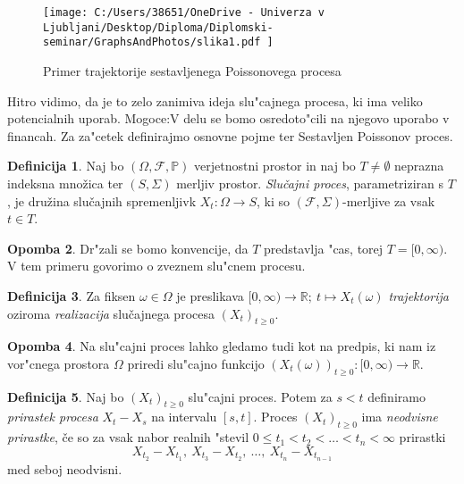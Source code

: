\documentclass[12pt,a4paper]{amsart}
\theoremstyle{definition} %
\newtheorem{definicija}{Definicija}[section]
\newtheorem{opomba}[definicija]{Opomba}
\theoremstyle{plain} %
\newcommand{\1}{\mathds{1}}
\begin{document}
    \begin{figure}[H]
        \centering
        \texttt{[image: 
            C:/Users/38651/OneDrive - Univerza v Ljubljani/Desktop/Diploma/Diplomski-seminar/GraphsAndPhotos/slika1.pdf
            ]}
        \caption{Primer trajektorije sestavljenega Poissonovega procesa}
        \label{fig:slika1}
    \end{figure}
    
    \noindent
    Hitro vidimo, da je to zelo zanimiva ideja slu"cajnega
    procesa, ki ima veliko potencialnih uporab. Mogoce:V delu se bomo osredoto"cili na njegovo uporabo v 
    financah. Za za"cetek definirajmo osnovne pojme ter Sestavljen Poissonov proces.

    \begin{definicija}
        Naj bo $(\Omega, \mathcal{F}, \mathbb{P})$ verjetnostni prostor in naj bo $T\neq\emptyset$
        neprazna indeksna množica ter $(S, \Sigma)$ merljiv prostor. \textit{Slučajni proces}, 
        parametriziran s $T$, je družina slučajnih spremenljivk $X_t : \Omega \to S$,
         ki so $(\mathcal{F}, \Sigma)$-merljive za vsak $t \in T$.
        \label{def:slucProc}
    \end{definicija}

    \begin{opomba}
        Dr"zali se bomo konvencije, da $T$ predstavlja "cas, torej $T = [0, \infty)$.
        V tem primeru govorimo o zveznem slu"cnem procesu.
        \label{op:TCas}
    \end{opomba}

    \begin{definicija}
        Za fiksen $\omega \in \Omega$ je preslikava 
        $[0, \infty) \rightarrow \mathbb{R}; \ t \mapsto X_t(\omega)$ 
        \textit{trajektorija} oziroma \textit{realizacija} slučajnega procesa $(X_t)_{t\geq0}$.
        \label{def:realizac}
    \end{definicija}

    \begin{opomba}
        Na slu"cajni proces lahko gledamo tudi kot na predpis, ki nam iz vor"cnega prostora 
        $\Omega$ priredi slu"cajno funkcijo
        $(X_t(\omega))_{t\geq0}: [0, \infty) \rightarrow \mathbb{R}$.
        \label{op:slucFunkc}
    \end{opomba}

    \begin{definicija}
        Naj bo $(X_t)_{t\geq0}$ slu"cajni proces. Potem za $s < t$ definiramo
        \textit{prirastek procesa} $X_t - X_s$ na intervalu $[s, t]$. Proces $(X_t)_{t\geq0}$ ima 
        \textit{neodvisne prirastke}, če so za vsak nabor realnih "stevil
        $0 \leq t_1 < t_2 < \ldots < t_n < \infty$ prirastki
        $$
            X_{t_2} - X_{t_1}, \ X_{t_3} - X_{t_2}, \ \ldots, \ X_{t_n} - X_{t_{n-1}}
        $$
        med seboj neodvisni.
        \label{def:prirastek}
    \end{definicija}
\end{document}
